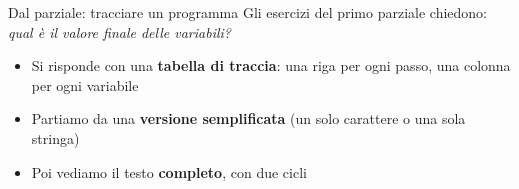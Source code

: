 \documentclass[aspectratio=169,10pt,t]{beamer}
\begin{document}

\begin{frame}{Dal parziale: tracciare un programma}
  Gli esercizi del primo parziale chiedono: \emph{qual \`e il valore finale delle variabili?}
  \begin{itemize}
    \item Si risponde con una \textbf{tabella di traccia}: una riga per ogni passo, una colonna per ogni variabile
    \item Partiamo da una \textbf{versione semplificata} (un solo carattere o una sola stringa)
    \item Poi vediamo il testo \textbf{completo}, con due cicli
  \end{itemize}
\end{frame}
\end{document}

